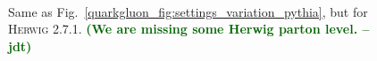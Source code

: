 \documentclass[11pt]{cernrep}
\newcommand{\jdt}[1]{\textbf{\textcolor{darkgreen}{(#1 --jdt)}}}
\begin{document}
\begin{figure}
\centering
{}
$\qquad$
\caption{Same as Fig.~\ref{quarkgluon_fig:settings_variation_pythia}, but for \textsc{Herwig 2.7.1}.  \jdt{We are missing some Herwig parton level.}}
\label{quarkgluon_fig:settings_variation_herwig}
\end{figure}
\end{document}
